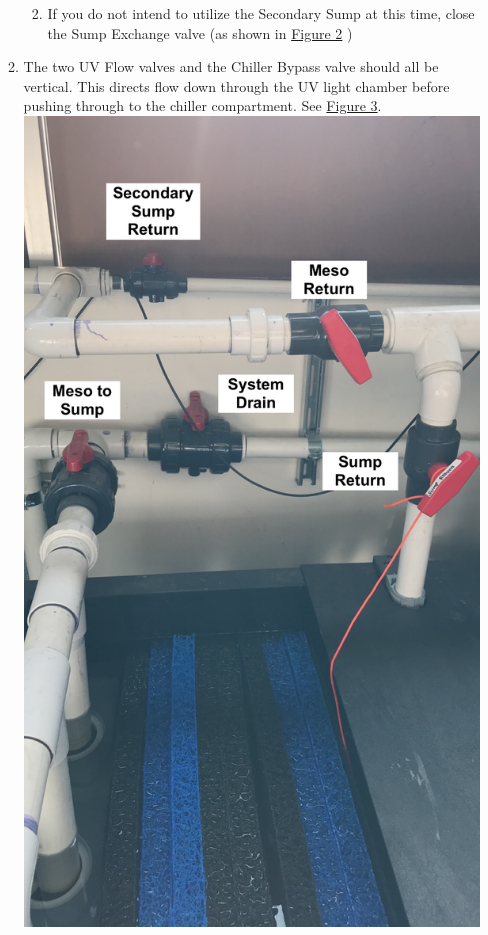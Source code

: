 \documentclass[
]{book}
\providecommand{\tightlist}{%
  \setlength{\itemsep}{0pt}\setlength{\parskip}{0pt}}
\begin{document}
\begin{enumerate}
\begin{enumerate}
    \begin{enumerate}
    \def\labelenumiii{\arabic{enumiii}.}
    \tightlist
    \item
      If you do not intend to utilize the Secondary Sump at this time, close the Sump Exchange valve (as shown in \protect\hyperlink{Figure2}{Figure 2} )
    \end{enumerate}
  \item
    The two UV Flow valves and the Chiller Bypass valve should all be vertical. This directs flow down through the UV light chamber before pushing through to the chiller compartment. See \protect\hyperlink{Figure3}{Figure 3}.\\
    \includegraphics{images/Sump_Flow_Valves.png}\\

\end{enumerate}
\end{enumerate}
\end{document}

